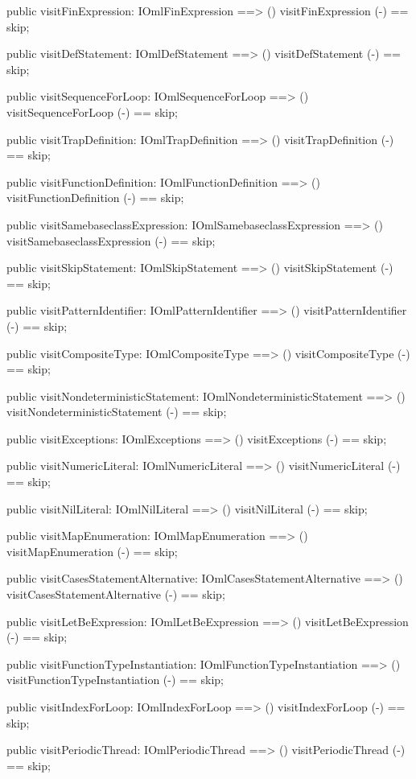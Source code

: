 \begin{vdm_al}
  public visitFinExpression: IOmlFinExpression ==> ()
  visitFinExpression (-) == skip;

  public visitDefStatement: IOmlDefStatement ==> ()
  visitDefStatement (-) == skip;

  public visitSequenceForLoop: IOmlSequenceForLoop ==> ()
  visitSequenceForLoop (-) == skip;

  public visitTrapDefinition: IOmlTrapDefinition ==> ()
  visitTrapDefinition (-) == skip;

  public visitFunctionDefinition: IOmlFunctionDefinition ==> ()
  visitFunctionDefinition (-) == skip;

  public visitSamebaseclassExpression: IOmlSamebaseclassExpression ==> ()
  visitSamebaseclassExpression (-) == skip;

  public visitSkipStatement: IOmlSkipStatement ==> ()
  visitSkipStatement (-) == skip;

  public visitPatternIdentifier: IOmlPatternIdentifier ==> ()
  visitPatternIdentifier (-) == skip;

  public visitCompositeType: IOmlCompositeType ==> ()
  visitCompositeType (-) == skip;

  public visitNondeterministicStatement: IOmlNondeterministicStatement ==> ()
  visitNondeterministicStatement (-) == skip;

  public visitExceptions: IOmlExceptions ==> ()
  visitExceptions (-) == skip;

  public visitNumericLiteral: IOmlNumericLiteral ==> ()
  visitNumericLiteral (-) == skip;

  public visitNilLiteral: IOmlNilLiteral ==> ()
  visitNilLiteral (-) == skip;

  public visitMapEnumeration: IOmlMapEnumeration ==> ()
  visitMapEnumeration (-) == skip;

  public visitCasesStatementAlternative: IOmlCasesStatementAlternative ==> ()
  visitCasesStatementAlternative (-) == skip;

  public visitLetBeExpression: IOmlLetBeExpression ==> ()
  visitLetBeExpression (-) == skip;

  public visitFunctionTypeInstantiation: IOmlFunctionTypeInstantiation ==> ()
  visitFunctionTypeInstantiation (-) == skip;

  public visitIndexForLoop: IOmlIndexForLoop ==> ()
  visitIndexForLoop (-) == skip;

  public visitPeriodicThread: IOmlPeriodicThread ==> ()
  visitPeriodicThread (-) == skip;


\end{vdm_al}
